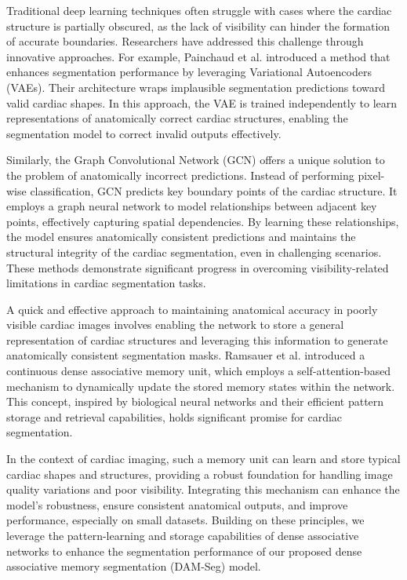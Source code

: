 \documentclass[preprint,12pt]{elsarticle}
\begin{document}
Traditional deep learning techniques often struggle with cases where the cardiac structure is partially obscured, as the lack of visibility can hinder the formation of accurate boundaries. Researchers have addressed this challenge through innovative approaches. For example, Painchaud et al. \cite{VAE_wrapping} introduced a method that enhances segmentation performance by leveraging Variational Autoencoders (VAEs). Their architecture wraps implausible segmentation predictions toward valid cardiac shapes. In this approach, the VAE is trained independently to learn representations of anatomically correct cardiac structures, enabling the segmentation model to correct invalid outputs effectively.

Similarly, the Graph Convolutional Network (GCN) \cite{GCN} offers a unique solution to the problem of anatomically incorrect predictions. Instead of performing pixel-wise classification, GCN predicts key boundary points of the cardiac structure. It employs a graph neural network to model relationships between adjacent key points, effectively capturing spatial dependencies. By learning these relationships, the model ensures anatomically consistent predictions and maintains the structural integrity of the cardiac segmentation, even in challenging scenarios. These methods demonstrate significant progress in overcoming visibility-related limitations in cardiac segmentation tasks.

A quick and effective approach to maintaining anatomical accuracy in poorly visible cardiac images involves enabling the network to store a general representation of cardiac structures and leveraging this information to generate anatomically consistent segmentation masks. Ramsauer et al. \cite{SA_update} introduced a continuous dense associative memory unit, which employs a self-attention-based mechanism to dynamically update the stored memory states within the network. This concept, inspired by biological neural networks and their efficient pattern storage and retrieval capabilities, holds significant promise for cardiac segmentation.

In the context of cardiac imaging, such a memory unit can learn and store typical cardiac shapes and structures, providing a robust foundation for handling image quality variations and poor visibility. Integrating this mechanism can enhance the model's robustness, ensure consistent anatomical outputs, and improve performance, especially on small datasets. Building on these principles, we leverage the pattern-learning and storage capabilities of dense associative networks to enhance the segmentation performance of our proposed dense associative memory segmentation (DAM-Seg) model.
\end{document}
